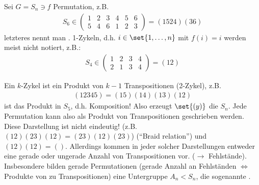 \begin{example}
	Sei $G = S_n \ni f$ Permutation, z.B.
	\begin{align*} S_6 \in
		\begin{pmatrix}
		1 & 2 &3 &4 & 5 & 6\\
		5 & 4 & 6 & 1 & 2 & 3
		\end{pmatrix}  = (1524)(36)
	\end{align*}
	letzteres nennt man . 1-Zykeln, d.h. $i \in \set{1,\dots,n}$ mit $f(i)=i$ werden meist nicht notiert, z.B.:
	\begin{align*} S_4 \in 
		\begin{pmatrix}
			1&2&3&4\\
			2&1&3&4
		\end{pmatrix} = (12)
	\end{align*}
\end{example}
\begin{remark}
	Ein $k$-Zykel ist ein Produkt von $k-1$ Transpositionen (2-Zykel), z.B.
	\begin{align*}
		(12345) = (15)(14)(13)(12)
	\end{align*}
	ist das Produkt in $S_5$, d.h. Komposition! Also erzeugt $\set{(y)}$ die $S_n$. Jede Permutation kann also als Produkt von Transpositionen geschrieben werden. Diese Darstellung ist nicht eindeutig! (z.B. $(12)(23)(12) = (23)(12)(23)$) (``Braid relation'') %
	und $(12)(12) = ()$. Allerdings kommen in jeder solcher Darstellungen entweder eine gerade oder ungerade Anzahl von Transpositionen vor. ($\to$ Fehlstände). Insbesondere bilden gerade Permutationen (gerade Anzahl an Fehlständen $\Leftrightarrow$ Produkte von zu Transpositionen) eine Untergruppe $A_n < S_n$, die sogenannte .
\end{remark}